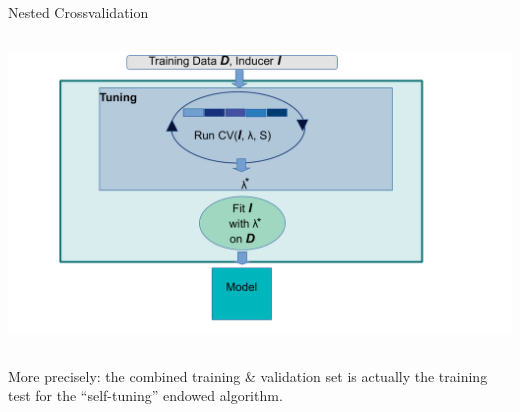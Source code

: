\begin{frame}{Nested Crossvalidation}
\begin{columns}[c, onlytextwidth]
\hspace*{-0.7cm}
\begin{center}
\includegraphics[width=1.2\textwidth]{images/autotune_in_model_fit.pdf}
\end{center}
\end{columns}

\framebreak

More precisely: the combined training \& validation set is actually the training test for the \enquote{self-tuning} endowed algorithm.


\end{frame}
